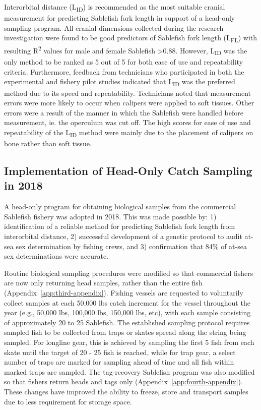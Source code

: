 \documentclass[12pt]{article}\usepackage[]{graphicx}\usepackage[]{color}
\begin{document}
Interorbital distance (L\textsubscript{ID}) is recommended as the most suitable cranial measurement for predicting Sablefish fork length in support of a head-only sampling program. All cranial dimensions collected during the research investigation were found to be good predictors of Sablefish fork length (L\textsubscript{FL}) with resulting R\textsuperscript{2} values for male and female Sablefish \textgreater0.88. However, L\textsubscript{ID} was the only method to be ranked as 5 out of 5 for both ease of use and repeatability criteria. Furthermore, feedback from technicians who participated in both the experimental and fishery pilot studies indicated that L\textsubscript{ID} was the preferred method due to its speed and repeatability. Technicians noted that measurement errors were more likely to occur when calipers were applied to soft tissues. Other errors were a result of the manner in which the Sablefish were handled before measurement, ie. the operculum was cut off. The high scores for ease of use and repeatability of the L\textsubscript{ID} method were mainly due to the placement of calipers on bone rather than soft tissue.

\hypertarget{implementation-of-head-only-catch-sampling-in-2018}{%
\subsection{Implementation of Head-Only Catch Sampling in 2018}\label{implementation-of-head-only-catch-sampling-in-2018}}

A head-only program for obtaining biological samples from the commercial Sablefish fishery was adopted in 2018. This was made possible by: 1) identification of a reliable method for predicting Sablefish fork length from interorbital distance, 2) successful development of a genetic protocol to audit at-sea sex determination by fishing crews, and 3) confirmation that 84\% of at-sea sex determinations were accurate.

Routine biological sampling procedures were modified so that commercial fishers are now only returning head samples, rather than the entire fish (Appendix~\ref{app:third-appendix}). Fishing vessels are requested to voluntarily collect samples at each 50,000 lbs catch increment for the vessel throughout the year (e.g., 50,000 lbs, 100,000 lbs, 150,000 lbs, etc), with each sample consisting of approximately 20 to 25 Sablefish. The established sampling protocol requires sampled fish to be collected from traps or skates spread along the string being sampled. For longline gear, this is achieved by sampling the first 5 fish from each skate until the target of 20 - 25 fish is reached, while for trap gear, a select number of traps are marked for sampling ahead of time and all fish within marked traps are sampled. The tag-recovery Sablefish program was also modified so that fishers return heads and tags only (Appendix~\ref{app:fourth-appendix}). These changes have improved the ability to freeze, store and transport samples due to less requirement for storage space.
\end{document}
